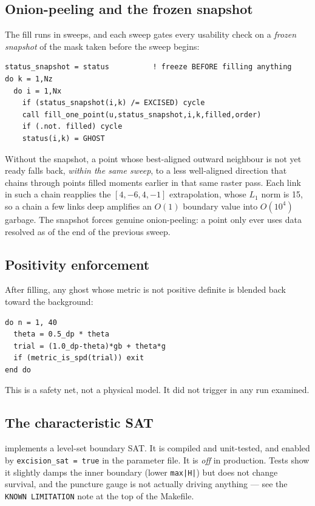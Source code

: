 \documentclass[11pt,openany]{book}
\begin{document}
\subsection{Onion-peeling and the frozen snapshot}

The fill runs in sweeps, and each sweep gates every usability check on a
\emph{frozen snapshot} of the mask taken before the sweep begins:
\begin{lstlisting}
status_snapshot = status          ! freeze BEFORE filling anything
do k = 1,Nz
  do i = 1,Nx
    if (status_snapshot(i,k) /= EXCISED) cycle
    call fill_one_point(u,status_snapshot,i,k,filled,order)
    if (.not. filled) cycle
    status(i,k) = GHOST
\end{lstlisting}

\gotcha
Without the snapshot, a point whose best-aligned outward neighbour is not yet
ready falls back, \emph{within the same sweep}, to a less well-aligned
direction that chains through points filled moments earlier in that same raster
pass. Each link in such a chain reapplies the $[4,-6,4,-1]$ extrapolation, whose
$L_1$ norm is 15, so a chain a few links deep amplifies an $O(1)$ boundary
value into $O(10^4)$ garbage. The snapshot forces genuine onion-peeling: a
point only ever uses data resolved as of the end of the previous sweep.

\subsection{Positivity enforcement}

After filling, any ghost whose metric is not positive definite is blended back
toward the background:
\begin{lstlisting}
do n = 1, 40
  theta = 0.5_dp * theta
  trial = (1.0_dp-theta)*gb + theta*g
  if (metric_is_spd(trial)) exit
end do
\end{lstlisting}
This is a safety net, not a physical model. It did not trigger in any run
examined.

\subsection{The characteristic SAT}

 implements a level-set boundary SAT. It is
compiled and unit-tested, and enabled by \texttt{excision\_sat = true} in the
parameter file. It is \emph{off} in production. Tests show it slightly damps
the inner boundary (lower \texttt{max|H|}) but does not change survival, and the
puncture gauge is not actually driving anything --- see the
\texttt{KNOWN LIMITATION} note at the top of the Makefile.
\end{document}
